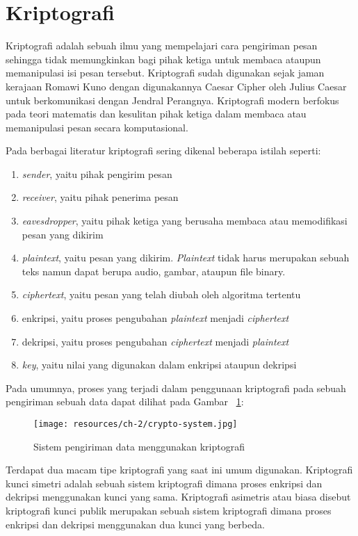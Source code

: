 \section{Kriptografi}
  Kriptografi adalah sebuah ilmu yang mempelajari cara pengiriman pesan sehingga tidak memungkinkan bagi pihak ketiga untuk membaca ataupun memanipulasi isi pesan tersebut. Kriptografi sudah digunakan sejak jaman kerajaan Romawi Kuno dengan digunakannya Caesar Cipher oleh Julius Caesar untuk berkomunikasi dengan Jendral Perangnya. Kriptografi modern berfokus pada teori matematis dan kesulitan pihak ketiga dalam membaca atau memanipulasi pesan secara komputasional.

  Pada berbagai literatur kriptografi sering dikenal beberapa istilah seperti:
  \begin{enumerate}[label=\roman*.]
    \item \textit{sender}, yaitu pihak pengirim pesan
    \item \textit{receiver}, yaitu pihak penerima pesan
    \item \textit{eavesdropper}, yaitu pihak ketiga yang berusaha membaca atau memodifikasi pesan yang dikirim
    \item \textit{plaintext}, yaitu pesan yang dikirim. \textit{Plaintext} tidak harus merupakan sebuah teks namun dapat berupa audio, gambar, ataupun file binary.
    \item \textit{ciphertext}, yaitu pesan yang telah diubah oleh algoritma tertentu
    \item enkripsi, yaitu proses pengubahan \textit{plaintext} menjadi \textit{ciphertext}
    \item dekripsi, yaitu proses pengubahan \textit{ciphertext} menjadi \textit{plaintext}
    \item \textit{key}, yaitu nilai yang digunakan dalam enkripsi ataupun dekripsi
  \end{enumerate}

  Pada umumnya, proses yang terjadi dalam penggunaan kriptografi pada sebuah pengiriman sebuah data dapat dilihat pada Gambar ~\ref{fig:krypto_system}:

  \begin{figure}[h]
    \centering
    \texttt{[image: resources/ch-2/crypto-system.jpg]}
    \caption{Sistem pengiriman data menggunakan kriptografi}
    \label{fig:krypto_system}
  \end{figure}

  Terdapat dua macam tipe kriptografi yang saat ini umum digunakan. Kriptografi kunci simetri adalah sebuah sistem kriptografi dimana proses enkripsi dan dekripsi menggunakan kunci yang sama. Kriptografi asimetris atau biasa disebut kriptografi kunci publik merupakan sebuah sistem kriptografi dimana proses enkripsi dan dekripsi menggunakan dua kunci yang berbeda.

